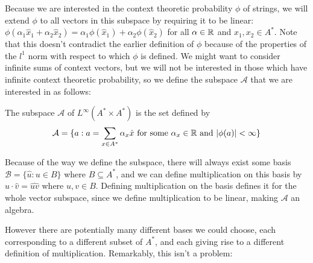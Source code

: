 Because we are interested in the context theoretic probability $\phi$ of strings, we will extend $\phi$ to all vectors in this subspace by requiring it to be linear: $\phi(\alpha_1 \hat{x}_1 + \alpha_2\hat{x}_2) = \alpha_1\phi(\hat{x}_1) + \alpha_2\phi(\hat{x}_2)$ for all $\alpha \in \mathbb{R}$ and $x_1, x_2 \in A^*$. Note that this doesn't contradict the earlier definition of $\phi$ because of the properties of the $l^1$ norm with respect to which $\phi$ is defined. We might want to consider infinite sums of context vectors, but we will not be interested in those which have infinite context theoretic probability, so we define the subspace $\mathcal{A}$ that we are interested in as follows:
\begin{defn}
The subspace $\mathcal{A}$ of $L^\infty(A^*\times A^*)$ is the set defined by
$$\mathcal{A} = \{a : a = \sum_{x\in A^*}\alpha_x \hat{x}\text{ for some }\alpha_x \in \mathbb{R}\text{ and }|\phi(a)| < \infty\}$$
\end{defn}


Because of the way we define the subspace, there will always exist some basis $\mathcal{B} = \{\hat{u} : u \in B\}$ where $B \subseteq A^*$, and we can define multiplication on this basis by $\hat{u}\cdot\hat{v} = \widehat{uv}$ where $u,v \in B$. Defining multiplication on the basis defines it for the whole vector subspace, since we define multiplication to be linear, making $\mathcal{A}$ an algebra.

However there are potentially many different bases we could choose, each corresponding to a different subset of $A^*$, and each giving rise to a different definition of multiplication. Remarkably, this isn't a problem:

